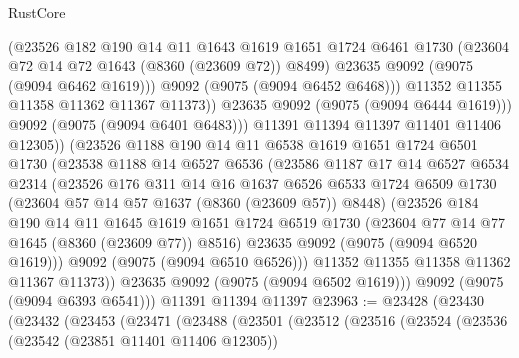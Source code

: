 \begin{lexlean}{RustCore}
\begin{coremodule}
                    (@23526
                      @182
                      @190
                      @14
                      @11
                      @1643
                      @1619
                      @1651
                      @1724
                      @6461
                      @1730
                      (@23604 @72 @14 @72 @1643 (@8360 (@23609 @72)) @8499)
                      @23635
                      @9092
                      (@9075 (@9094 @6462 @1619)))
                    @9092
                    (@9075 (@9094 @6452 @6468)))
                  @11352
                  @11355
                  @11358
                  @11362
                  @11367
                  @11373))
              @23635
              @9092
              (@9075 (@9094 @6444 @1619)))
            @9092
            (@9075 (@9094 @6401 @6483)))
          @11391
          @11394
          @11397
          @11401
          @11406
          @12305))
      (@23526
        @1188
        @190
        @14
        @11
        @6538
        @1619
        @1651
        @1724
        @6501
        @1730
        (@23538
          @1188
          @14
          @6527
          @6536
          (@23586
            @1187
            @17
            @14
            @6527
            @6534
            @2314
            (@23526
              @176
              @311
              @14
              @16
              @1637
              @6526
              @6533
              @1724
              @6509
              @1730
              (@23604 @57 @14 @57 @1637 (@8360 (@23609 @57)) @8448)
              (@23526
                @184
                @190
                @14
                @11
                @1645
                @1619
                @1651
                @1724
                @6519
                @1730
                (@23604 @77 @14 @77 @1645 (@8360 (@23609 @77)) @8516)
                @23635
                @9092
                (@9075 (@9094 @6520 @1619)))
              @9092
              (@9075 (@9094 @6510 @6526)))
            @11352
            @11355
            @11358
            @11362
            @11367
            @11373))
        @23635
        @9092
        (@9075 (@9094 @6502 @1619)))
      @9092
      (@9075 (@9094 @6393 @6541)))
    @11391
    @11394
    @11397
@23963 := @23428
    (@23430
      (@23432
        (@23453
          (@23471
            (@23488
              (@23501
                (@23512
                  (@23516
                    (@23524
                      (@23536
                        (@23542 (@23851 @11401 @11406 @12305))

\end{coremodule}
\end{lexlean}
